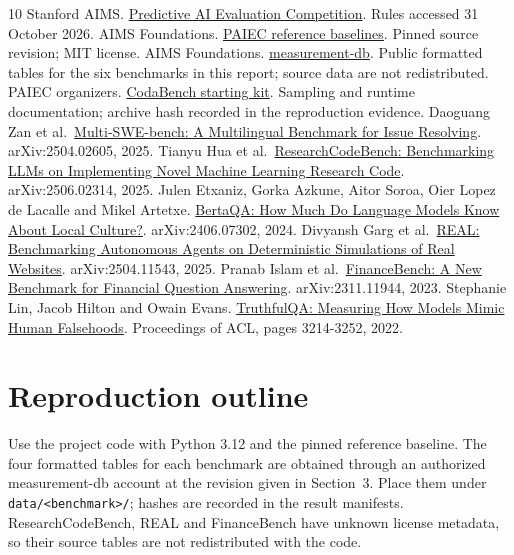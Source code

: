 \documentclass{article}
\begin{document}
\label{main-end}
\clearpage
\begin{thebibliography}{10}
Stanford AIMS. \href{https://aims.stanford.edu/competition}{Predictive AI Evaluation Competition}. Rules accessed 31 October 2026.
AIMS Foundations. \href{https://github.com/aims-foundations/paiec_baseline/tree/cc88a959c1e5e7462f31a9215baba066ce6d6e2b}{PAIEC reference baselines}. Pinned source revision; MIT license.
AIMS Foundations. \href{https://huggingface.co/datasets/aims-foundations/measurement-db/tree/54074453da7b9911be0f48e4c560be547bc84d21}{measurement-db}. Public formatted tables for the six benchmarks in this report; source data are not redistributed.
PAIEC organizers. \href{https://www.codabench.org/datasets/download/4ae12cd5-cc62-4c11-bad5-d9a51381b39b/}{CodaBench starting kit}. Sampling and runtime documentation; archive hash recorded in the reproduction evidence.
Daoguang Zan et al.~\href{https://arxiv.org/abs/2504.02605}{Multi-SWE-bench: A Multilingual Benchmark for Issue Resolving}. arXiv:2504.02605, 2025.
Tianyu Hua et al.~\href{https://arxiv.org/abs/2506.02314}{ResearchCodeBench: Benchmarking LLMs on Implementing Novel Machine Learning Research Code}. arXiv:2506.02314, 2025.
Julen Etxaniz, Gorka Azkune, Aitor Soroa, Oier Lopez de Lacalle and Mikel Artetxe. \href{https://arxiv.org/abs/2406.07302}{BertaQA: How Much Do Language Models Know About Local Culture?}. arXiv:2406.07302, 2024.
Divyansh Garg et al.~\href{https://arxiv.org/abs/2504.11543}{REAL: Benchmarking Autonomous Agents on Deterministic Simulations of Real Websites}. arXiv:2504.11543, 2025.
Pranab Islam et al.~\href{https://arxiv.org/abs/2311.11944v1}{FinanceBench: A New Benchmark for Financial Question Answering}. arXiv:2311.11944, 2023.
Stephanie Lin, Jacob Hilton and Owain Evans. \href{https://aclanthology.org/2022.acl-long.229/}{TruthfulQA: Measuring How Models Mimic Human Falsehoods}. Proceedings of ACL, pages 3214-3252, 2022.
\end{thebibliography}
\clearpage
\appendix
\section{Reproduction outline}
Use the project code with Python 3.12 and the pinned reference baseline. The
four formatted tables for each benchmark are obtained through an authorized
measurement-db account at the revision given in Section~3. Place them under
\texttt{data/<benchmark>/}; hashes are recorded in the result manifests.
ResearchCodeBench, REAL and FinanceBench have unknown license metadata, so
their source tables are not redistributed with the code.
\end{document}
